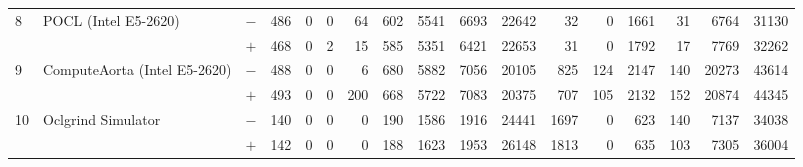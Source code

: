 \begin{tabular}{lll | rrrrrrr | rrrrrrr }
\hline
\multirow{ 2}{*}{8} & \multirow{ 2}{*}{POCL (Intel E5-2620)} & $-$ & 486 & 0 & 0 & 64 & 602 & 5541 & 6693       & 22642 & 32 & 0 & 1661 & 31 & 6764 & 31130 \\& & $+$ & 468 & 0 & 2 & 15 & 585 & 5351 & 6421 & 22653 & 31 & 0 & 1792 & 17 & 7769 & 32262 \\
\hline
\multirow{ 2}{*}{9} & \multirow{ 2}{*}{ComputeAorta (Intel E5-2620)} & $-$ & 488 & 0 & 0 & 6 & 680 & 5882 & 7056       & 20105 & 825 & 124 & 2147 & 140 & 20273 & 43614 \\& & $+$ & 493 & 0 & 0 & 200 & 668 & 5722 & 7083 & 20375 & 707 & 105 & 2132 & 152 & 20874 & 44345 \\
\hline
\multirow{ 2}{*}{10} & \multirow{ 2}{*}{Oclgrind Simulator} & $-$ & 140 & 0 & 0 & 0 & 190 & 1586 & 1916       & 24441 & 1697 & 0 & 623 & 140 & 7137 & 34038 \\& & $+$ & 142 & 0 & 0 & 0 & 188 & 1623 & 1953 & 26148 & 1813 & 0 & 635 & 103 & 7305 & 36004 \\
  \bottomrule
\end{tabular}

